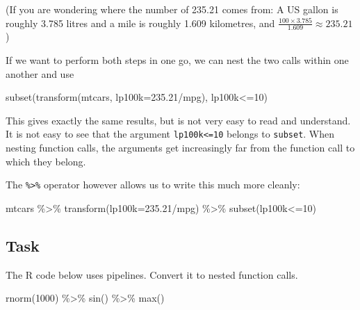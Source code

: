\documentclass[
]{book}
\newenvironment{Shaded}{\begin{snugshade}}{\end{snugshade}}
\newcommand{\AttributeTok}[1]{\textcolor[rgb]{0.77,0.63,0.00}{#1}}
\newcommand{\DecValTok}[1]{\textcolor[rgb]{0.00,0.00,0.81}{#1}}
\newcommand{\FloatTok}[1]{\textcolor[rgb]{0.00,0.00,0.81}{#1}}
\newcommand{\FunctionTok}[1]{\textcolor[rgb]{0.00,0.00,0.00}{#1}}
\newcommand{\NormalTok}[1]{#1}
\newcommand{\SpecialCharTok}[1]{\textcolor[rgb]{0.00,0.00,0.00}{#1}}
\begin{document}
(If you are wondering where the number of 235.21 comes from: A US gallon is roughly 3.785 litres and a mile is roughly 1.609 kilometres, and \(\frac{100\times 3.785}{1.609}\approx 235.21\))

If we want to perform both steps in one go, we can nest the two calls within one another and use

\begin{Shaded}
\begin{Highlighting}[]
\FunctionTok{subset}\NormalTok{(}\FunctionTok{transform}\NormalTok{(mtcars, }\AttributeTok{lp100k=}\FloatTok{235.21}\SpecialCharTok{/}\NormalTok{mpg), lp100k}\SpecialCharTok{\textless{}=}\DecValTok{10}\NormalTok{)}
\end{Highlighting}
\end{Shaded}

This gives exactly the same results, but is not very easy to read and understand. It is not easy to see that the argument \texttt{lp100k\textless{}=10} belongs to \texttt{subset}. When nesting function calls, the arguments get increasingly far from the function call to which they belong.

The \texttt{\%\textgreater{}\%} operator however allows us to write this much more cleanly:

\begin{Shaded}
\begin{Highlighting}[]
\NormalTok{mtcars }\SpecialCharTok{\%\textgreater{}\%}
  \FunctionTok{transform}\NormalTok{(}\AttributeTok{lp100k=}\FloatTok{235.21}\SpecialCharTok{/}\NormalTok{mpg) }\SpecialCharTok{\%\textgreater{}\%}
  \FunctionTok{subset}\NormalTok{(lp100k}\SpecialCharTok{\textless{}=}\DecValTok{10}\NormalTok{)}
\end{Highlighting}
\end{Shaded}

\hypertarget{task}{%
\subsection{Task}\label{task}}

The R code below uses pipelines. Convert it to nested function calls.

\begin{Shaded}
\begin{Highlighting}[]
\FunctionTok{rnorm}\NormalTok{(}\DecValTok{1000}\NormalTok{) }\SpecialCharTok{\%\textgreater{}\%} \FunctionTok{sin}\NormalTok{() }\SpecialCharTok{\%\textgreater{}\%} \FunctionTok{max}\NormalTok{()}
\end{Highlighting}
\end{Shaded}
\end{document}
